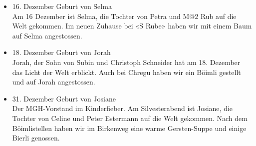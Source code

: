 \begin{history}
\begin{itemize}
            \item 16. Dezember Geburt von Selma\\
                  Am 16 Dezember ist Selma, die Tochter von Petra und M@2 Rub auf
                  die Welt gekommen. Im neuen Zuhause bei «S Rube» haben wir mit
                  einem Baum auf Selma angestossen.

            \item 18. Dezember Geburt von Jorah\\
                  Jorah, der Sohn von Subin und Christoph Schneider hat am 18.
                  Dezember das Licht der Welt erblickt. Auch bei Chregu haben wir
                  ein Böimli gestellt und auf Jorah angestossen.

            \item 31. Dezember Geburt von Josiane\\
                  Der MGH-Vorstand im Kinderfieber. Am Silvesterabend ist Josiane,
                  die Tochter von Celine und Peter Estermann auf die Welt gekommen.
                  Nach dem Böimlistellen haben wir im Birkenweg eine warme
                  Gersten-Suppe und einige Bierli genossen.


      \end{itemize}

\end{history}
